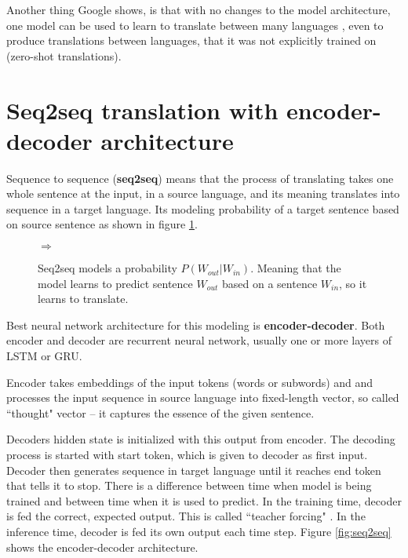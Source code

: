 \documentclass{ExcelAtFIT}
\begin{document}
Another thing Google shows, is that with no changes to the model architecture, one model can be used to learn to translate between many languages \cite{googleMultiLingual}, even to produce translations between languages, that it was not explicitly trained on (zero-shot translations).

\section{Seq2seq translation with encoder-decoder architecture}
Sequence to sequence (\textbf{seq2seq}) means that the process of translating takes one whole sentence at the input, in a source language, and its meaning translates into sequence in a target language. Its modeling probability of a target sentence based on source sentence as shown in figure \ref{fig:seqProbability}.

\begin{figure}[h!]
    \begin{center}
        \setlength{\fboxsep}{8pt}
        $\Longrightarrow$
    \end{center}
	\caption{Seq2seq models a probability $P(W_{out}|W_{in})$. Meaning that the model learns to predict sentence $W_{out}$ based on a sentence $W_{in}$, so it learns to translate.}
	\label{fig:seqProbability}
\end{figure}

Best neural network architecture for this modeling is \textbf{encoder-decoder}. Both encoder and decoder are recurrent neural network, usually one or more layers of LSTM or GRU.

Encoder takes embeddings of the input tokens (words or subwords) and and processes the input sequence in source language into fixed-length vector, so called ``thought" vector -- it captures the essence of the given sentence.

Decoders hidden state is initialized with this output from encoder. The decoding process is started with start token, which is given to decoder as first input. Decoder then generates sequence in target language until it reaches end token that tells it to stop. There is a difference between time when model is being trained and between time when it is used to predict. In the training time, decoder is fed the correct, expected output. This is called ``teacher forcing" \cite{teacherForcing}. In the inference time, decoder is fed its own output each time step. Figure \ref{fig:seq2seq} shows the encoder-decoder architecture.
\end{document}
